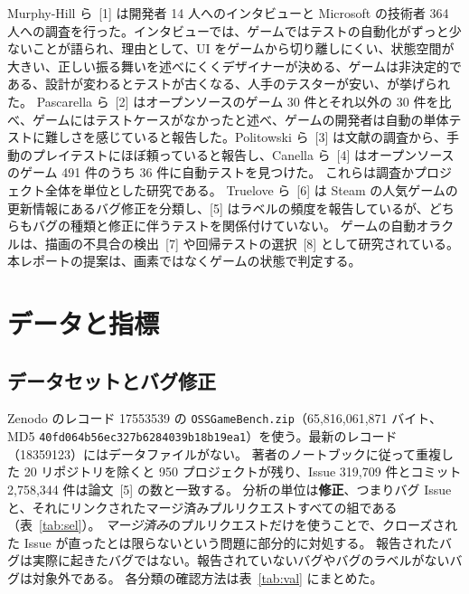 \documentclass[a4paper,twocolumn,9pt]{ltjsarticle}
\begin{document}
Murphy-Hill ら~[1] は開発者 14 人へのインタビューと Microsoft の技術者 364 人への調査を行った。インタビューでは、ゲームではテストの自動化がずっと少ないことが語られ、理由として、UI をゲームから切り離しにくい、状態空間が大きい、正しい振る舞いを述べにくくデザイナーが決める、ゲームは非決定的である、設計が変わるとテストが古くなる、人手のテスターが安い、が挙げられた。
Pascarella ら~[2] はオープンソースのゲーム 30 件とそれ以外の 30 件を比べ、ゲームにはテストケースがなかったと述べ、ゲームの開発者は自動の単体テストに難しさを感じていると報告した。Politowski ら~[3] は文献の調査から、手動のプレイテストにほぼ頼っていると報告し、Canella ら~[4] はオープンソースのゲーム 491 件のうち 36 件に自動テストを見つけた。
これらは調査かプロジェクト全体を単位とした研究である。
Truelove ら~[6] は Steam の人気ゲームの更新情報にあるバグ修正を分類し、[5] はラベルの頻度を報告しているが、どちらもバグの種類と修正に伴うテストを関係付けていない。
ゲームの自動オラクルは、描画の不具合の検出~[7] や回帰テストの選択~[8] として研究されている。本レポートの提案は、画素ではなくゲームの状態で判定する。

\section{データと指標}\label{sec:data}

\subsection{データセットとバグ修正}\label{sec:selection}
Zenodo のレコード 17553539 の \texttt{OSSGameBench.zip}（65,816,061,871 バイト、MD5 \texttt{40fd064b56ec327b6284039b18b19ea1}）を使う。最新のレコード（18359123）にはデータファイルがない。
著者のノートブックに従って重複した 20 リポジトリを除くと 950 プロジェクトが残り、Issue 319,709 件とコミット 2,758,344 件は論文~[5] の数と一致する。
分析の単位は\textbf{修正}、つまりバグ Issue と、それにリンクされたマージ済みプルリクエストすべての組である（表~\ref{tab:sel}）。
\emph{マージ済み}のプルリクエストだけを使うことで、クローズされた Issue が直ったとは限らないという問題に部分的に対処する。
報告されたバグは実際に起きたバグではない。報告されていないバグやバグのラベルがないバグは対象外である。
各分類の確認方法は表~\ref{tab:val} にまとめた。
\end{document}

